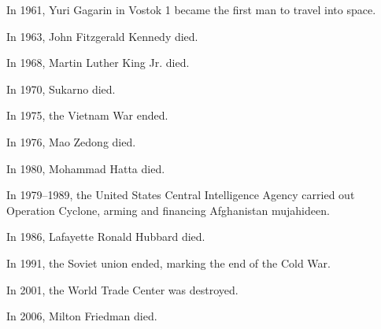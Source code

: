 In 1961, Yuri Gagarin in Vostok 1
became the first man to travel into space.

In 1963, John Fitzgerald Kennedy died.

In 1968, Martin Luther King Jr. died.

In 1970, Sukarno died.

In 1975, the Vietnam War ended.

In 1976, Mao Zedong died.

In 1980, Mohammad Hatta died.

In 1979--1989, the United States Central Intelligence Agency
carried out Operation Cyclone,
arming and financing Afghanistan mujahideen.

In 1986, Lafayette Ronald Hubbard died.

In 1991, the Soviet union ended, marking the end of the Cold War.

In 2001, the World Trade Center was destroyed.

In 2006, Milton Friedman died.
